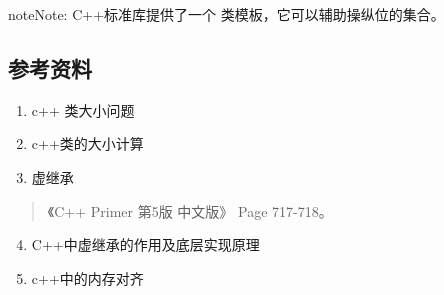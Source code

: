 \documentclass[letterpaper,10pt,english]{sphinxmanual}
\begin{document}
\begin{sphinxadmonition}{note}{Note:}
C++标准库提供了一个  类模板，它可以辅助操纵位的集合。
\end{sphinxadmonition}


\subsection{参考资料}
\label{\detokenize{cpp/04_classSize:id13}}\begin{enumerate}
\item {} 
c++ 类大小问题

\end{enumerate}
\begin{quote}

\end{quote}
\begin{enumerate}
\setcounter{enumi}{1}
\item {} 
c++类的大小计算

\end{enumerate}
\begin{quote}

\end{quote}
\begin{enumerate}
\setcounter{enumi}{2}
\item {} 
虚继承

\end{enumerate}
\begin{quote}

《C++ Primer 第5版 中文版》 Page 717-718。
\end{quote}
\begin{enumerate}
\setcounter{enumi}{3}
\item {} 
C++中虚继承的作用及底层实现原理

\end{enumerate}
\begin{quote}

\end{quote}
\begin{enumerate}
\setcounter{enumi}{4}
\item {} 
c++中的内存对齐

\end{enumerate}
\begin{quote}

\end{quote}
\end{document}
